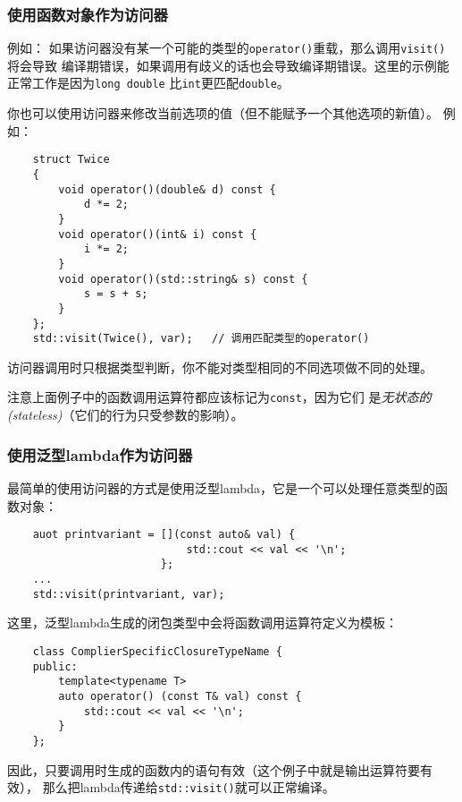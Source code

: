 \subsubsection{使用函数对象作为访问器}
例如：
如果访问器没有某一个可能的类型的\texttt{operator()}重载，那么调用\texttt{visit()}将会导致
编译期错误，如果调用有歧义的话也会导致编译期错误。这里的示例能正常工作是因为\texttt{long double}
比\texttt{int}更匹配\texttt{double}。

你也可以使用访问器来修改当前选项的值（但不能赋予一个其他选项的新值）。
例如：
\begin{lstlisting}
    struct Twice
    {
        void operator()(double& d) const {
            d *= 2;
        }
        void operator()(int& i) const {
            i *= 2;
        }
        void operator()(std::string& s) const {
            s = s + s;
        }
    };
    std::visit(Twice(), var);   // 调用匹配类型的operator()
\end{lstlisting}
访问器调用时只根据类型判断，你不能对类型相同的不同选项做不同的处理。

注意上面例子中的函数调用运算符都应该标记为\texttt{const}，因为它们
是\emph{无状态的(stateless)}（它们的行为只受参数的影响）。

\subsubsection{使用泛型lambda作为访问器}\label{ch16.3.3.2}
最简单的使用访问器的方式是使用泛型lambda，它是一个可以处理任意类型的函数对象：
\begin{lstlisting}
    auot printvariant = [](const auto& val) {
                            std::cout << val << '\n';
                        };
    ...
    std::visit(printvariant, var);
\end{lstlisting}
这里，泛型lambda生成的闭包类型中会将函数调用运算符定义为模板：
\begin{lstlisting}
    class ComplierSpecificClosureTypeName {
    public:
        template<typename T>
        auto operator() (const T& val) const {
            std::cout << val << '\n';
        }
    };
\end{lstlisting}
因此，只要调用时生成的函数内的语句有效（这个例子中就是输出运算符要有效），
那么把lambda传递给\texttt{std::visit()}就可以正常编译。

